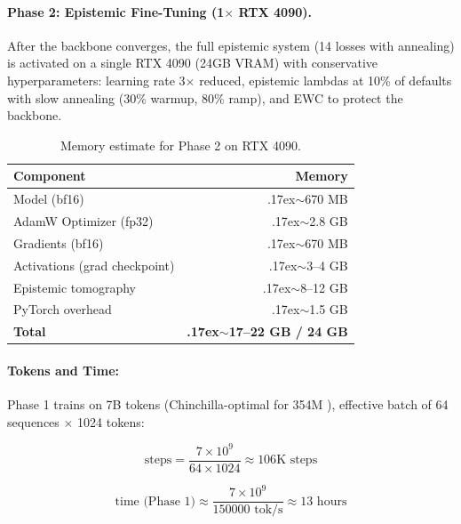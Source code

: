 \paragraph{Phase 2: Epistemic Fine-Tuning (1$\times$ RTX 4090).}
After the backbone converges, the full epistemic system (14 losses with annealing)
is activated on a single RTX 4090 (24GB VRAM) with conservative hyperparameters:
learning rate 3$\times$ reduced, epistemic lambdas at 10\% of defaults with slow
annealing (30\% warmup, 80\% ramp), and EWC to protect the backbone.

\begin{table}[H]
\centering
\caption{Memory estimate for Phase 2 on RTX 4090.}
\label{tab:memory}
\begin{tabular}{lr}
\toprule
\textbf{Component} & \textbf{Memory} \\
\midrule
Model (bf16) & {\raise.17ex\hbox{$\scriptstyle\sim$}}670 MB \\
AdamW Optimizer (fp32) & {\raise.17ex\hbox{$\scriptstyle\sim$}}2.8 GB \\
Gradients (bf16) & {\raise.17ex\hbox{$\scriptstyle\sim$}}670 MB \\
Activations (grad checkpoint) & {\raise.17ex\hbox{$\scriptstyle\sim$}}3--4 GB \\
Epistemic tomography & {\raise.17ex\hbox{$\scriptstyle\sim$}}8--12 GB \\
PyTorch overhead & {\raise.17ex\hbox{$\scriptstyle\sim$}}1.5 GB \\
\midrule
\textbf{Total} & \textbf{{\raise.17ex\hbox{$\scriptstyle\sim$}}17--22 GB / 24 GB} \\
\bottomrule
\end{tabular}
\end{table}

\paragraph{Tokens and Time:}
Phase 1 trains on 7B tokens (Chinchilla-optimal for 354M \cite{hoffmann2022chinchilla}),
effective batch of 64 sequences $\times$ 1024 tokens:

\begin{equation}
    \text{steps} = \frac{7 \times 10^9}{64 \times 1024} \approx 106\text{K steps}
\end{equation}

\begin{equation}
    \text{time (Phase 1)} \approx \frac{7 \times 10^9}{150000 \text{ tok/s}} \approx 13 \text{ hours}
\end{equation}

